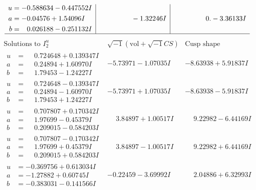 \documentclass[1p]{elsarticle_modified}
\theoremstyle{definition}
\newcommand{\I}{\sqrt{-1}}
\begin{document}
$$\begin{array}{c|c|c}
\begin{aligned}
u &= -0.588634 - 0.447552 I \\
a &= -0.04576 + 1.54096 I \\
b &= \phantom{-}0.026188 - 0.251132 I\end{aligned}
 & \phantom{-0.000000 } -1.32246 I & \phantom{-0.000000 } 0. - 3.36133 I\\
 \hline 
 \end{array}$$\newpage$$\begin{array}{c|c|c}  
\text{Solutions to }I^u_{2}& \I (\text{vol} + \sqrt{-1}CS) & \text{Cusp shape}\\
 \hline 
\begin{aligned}
u &= \phantom{-}0.724648 + 0.139347 I \\
a &= \phantom{-}0.24894 + 1.60970 I \\
b &= \phantom{-}1.79453 - 1.24227 I\end{aligned}
 & -5.73971 - 1.07035 I & -8.63938 + 5.91837 I \\ \hline\begin{aligned}
u &= \phantom{-}0.724648 - 0.139347 I \\
a &= \phantom{-}0.24894 - 1.60970 I \\
b &= \phantom{-}1.79453 + 1.24227 I\end{aligned}
 & -5.73971 + 1.07035 I & -8.63938 - 5.91837 I \\ \hline\begin{aligned}
u &= \phantom{-}0.707807 + 0.170342 I \\
a &= \phantom{-}1.97699 - 0.45379 I \\
b &= \phantom{-}0.209015 - 0.584203 I\end{aligned}
 & \phantom{-}3.84897 + 1.00517 I & \phantom{-}9.22982 - 6.44169 I \\ \hline\begin{aligned}
u &= \phantom{-}0.707807 - 0.170342 I \\
a &= \phantom{-}1.97699 + 0.45379 I \\
b &= \phantom{-}0.209015 + 0.584203 I\end{aligned}
 & \phantom{-}3.84897 - 1.00517 I & \phantom{-}9.22982 + 6.44169 I \\ \hline\begin{aligned}
u &= -0.369756 + 0.613034 I \\
a &= -1.27882 + 0.60745 I \\
b &= -0.383031 - 0.141566 I\end{aligned}
 & -0.22459 - 3.69992 I & \phantom{-}2.04886 + 6.32993 I \\ \hline\begin{aligned}

\end{aligned}
\end{array}$$
\end{document}
